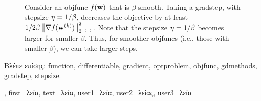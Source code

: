 {{\begin{figure}[H]
\begin{center}
	    	\end{center}
	    	\caption{Consider an \gls{objfunc} $f({\bf w})$ that is $\beta$-smooth. Taking a \gls{gradstep}, with \gls{stepsize} $\eta = 1/\beta$, decreases the 
	    		objective by at least ${1}/{2\beta}\left\Vert {\nabla f({\bf w}^{(k)})} \right\Vert_{2}^{2}$ \cite{nesterov04}, \cite{CvxBubeck2015}, \cite{CvxAlgBertsekas}. 
	    		Note that the \gls{stepsize} $\eta = 1/\beta$ becomes larger for smaller $\beta$. Thus, for smoother \gls{objfunc}s (i.e., those with smaller $\beta$), 
			we can take larger steps. \label{fig_gd_smooth_dict}}
	    	\end{figure}
		\foreignlanguage{greek}{Βλέπε επίσης:} \gls{function}, \gls{differentiable}, \gls{gradient}, \gls{optproblem}, \gls{objfunc}, \gls{gdmethods}, 
		\gls{gradstep}, \gls{stepsize}. },
	first={\foreignlanguage{greek}{λεία}},
	text={\foreignlanguage{greek}{λεία}},
	user1={\foreignlanguage{greek}{λεία}}, %
	user2={\foreignlanguage{greek}{λείας}}, %
	user3={\foreignlanguage{greek}{λεία}} %
}

